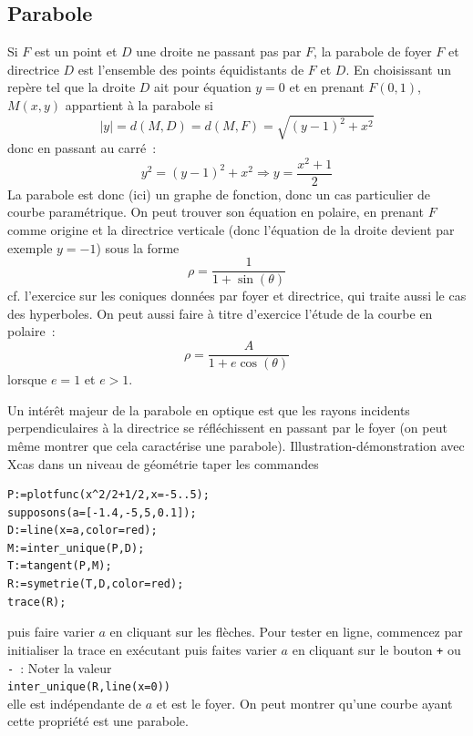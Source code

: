 \documentclass[a4paper,11pt]{book}
\begin{document}
\begin{giacjshere}
\subsection{Parabole}
Si $F$ est un point et $D$ une droite ne passant pas par $F$, la
parabole de foyer $F$ et directrice $D$ est l'ensemble des points
\'equidistants de $F$ et $D$.
En choisissant un rep\`ere tel que la droite $D$ ait pour \'equation
$y=0$ et en prenant $F(0,1)$, $M(x,y)$ appartient \`a la parabole
si 
$$|y|=d(M,D)=d(M,F)=\sqrt{(y-1)^2+x^2} $$
donc en passant au carr\'e~:
$$ y^2=(y-1)^2+x^2 \Rightarrow y=\frac{x^2+1}{2}$$
La parabole est donc (ici) un graphe de fonction, donc
un cas particulier de courbe param\'etrique.
On peut trouver son \'equation en polaire,
en prenant $F$ comme origine et la directrice
verticale (donc l'\'equation de la droite
devient par exemple $y=-1$) sous la forme
$$ \rho=\frac{1}{1+\sin(\theta)}$$
cf. l'exercice sur les coniques donn\'ees par foyer et directrice,
qui traite aussi le cas des hyperboles. On peut aussi faire \`a
titre d'exercice l'\'etude de la courbe en polaire~:
\[ \rho = \frac{A}{1+e\cos(\theta)}\]
lorsque $e=1$ et $e>1$.

Un int\'er\^et majeur de la parabole en optique est que
les rayons incidents perpendiculaires \`a la directrice
se r\'efl\'echissent en passant par le
foyer (on peut m\^eme montrer que cela caract\'erise
une parabole). Illustration-d\'emonstration
avec Xcas dans un niveau de g\'eom\'etrie taper les commandes
\begin{verbatim}
P:=plotfunc(x^2/2+1/2,x=-5..5);
supposons(a=[-1.4,-5,5,0.1]);
D:=line(x=a,color=red);
M:=inter_unique(P,D);
T:=tangent(P,M);
R:=symetrie(T,D,color=red);
trace(R);
\end{verbatim}
puis faire varier $a$ en cliquant sur les fl\`eches. Pour tester en
ligne, commencez par initialiser la trace en ex\'ecutant
puis faites varier $a$ en cliquant sur le bouton \verb|+| ou \verb|-|~: 
Noter la valeur\\ \verb|inter_unique(R,line(x=0))|\\
elle est ind\'ependante de $a$ et est le foyer. On peut
montrer qu'une courbe ayant cette propri\'et\'e est
une parabole.
 

\end{giacjshere}
\end{document}
